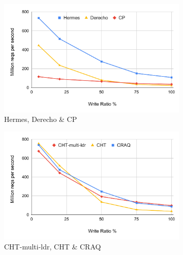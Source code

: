 \begin{figure}[t]
\centering
  \begin{subfigure}[t]{0.33\textwidth}
    \includegraphics[width=\textwidth]{1_figures/hr-dr-cp.pdf}
    \captionsetup{width=\linewidth}
   \caption{Hermes, Derecho \& CP}
  \label{fig:hr-dr-cp}
  \end{subfigure}
  \begin{subfigure}[t]{0.33\textwidth}
    \includegraphics[width=\textwidth]{1_figures/craq-cht-chtml.pdf}
    \captionsetup{width=0.95\linewidth}
    \caption{CHT-multi-ldr, CHT \& CRAQ}
  \label{fig:cht-cht-craq}
  \end{subfigure}
  \begin{subfigure}[t]{0.33\textwidth} 
  

\end{subfigure}
\end{figure}
